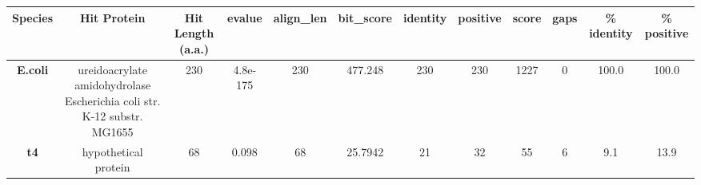 \begin{tabular}{|c|c|c|c|c|c|c|c|c|c|c|c|} \hline
\textbf{Species} & \textbf{Hit Protein} & \textbf{Hit Length (a.a.)} & \textbf{evalue} & \textbf{align\_len} & \textbf{bit\_score} & \textbf{identity} & \textbf{positive} & \textbf{score} & \textbf{gaps} & \textbf{\% identity} & \textbf{\% positive} \\ \hline
\textbf{E.coli} & ureidoacrylate amidohydrolase Escherichia coli str. K-12 substr. MG1655 & 230 & 4.8e-175 & 230 & 477.248 & 230 & 230 & 1227 & 0 & 100.0 & 100.0\\
\textbf{t4} & hypothetical protein  & 68 & 0.098 & 68 & 25.7942 & 21 & 32 & 55 & 6 & 9.1 & 13.9\\
\hline \end{tabular}
